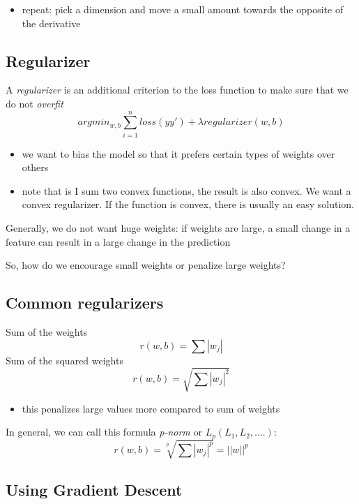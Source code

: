 \documentclass[11pt]{article}
\begin{document}
\begin{itemize}
\tightlist
\item
  repeat: pick a dimension and move a small amount towards the opposite
  of the derivative
\end{itemize}

\subsection{Regularizer}\label{regularizer}

A \emph{regularizer} is an additional criterion to the loss function to
make sure that we do not \emph{overfit}
\[argmin_{w, b}\sum_{i=1}^nloss(yy')+\lambda regularizer(w, b)\]

\begin{itemize}
\tightlist
\item
  we want to bias the model so that it prefers certain types of weights
  over others
\item
  note that is I sum two convex functions, the result is also convex. We
  want a convex regularizer. If the function is convex, there is usually
  an easy solution.
\end{itemize}

Generally, we do not want huge weights: if weights are large, a small
change in a feature can result in a large change in the prediction

So, how do we encourage small weights or penalize large weights?

\subsection{Common regularizers}\label{common-regularizers}

Sum of the weights \[r(w, b)=\sum |w_j|\] Sum of the squared weights
\[r(w, b)=\sqrt{\sum |w_j|^2}\]

\begin{itemize}
\tightlist
\item
  this penalizes large values more compared to sum of weights
\end{itemize}

In general, we can call this formula \emph{p-norm} or
\(L_p (L_1, L_2, ....)\): \[r(w, b)=\sqrt[p]{\sum |w_j|^p}=||w||^p\]

\subsection{Using Gradient Descent}\label{using-gradient-descent}
\end{document}
